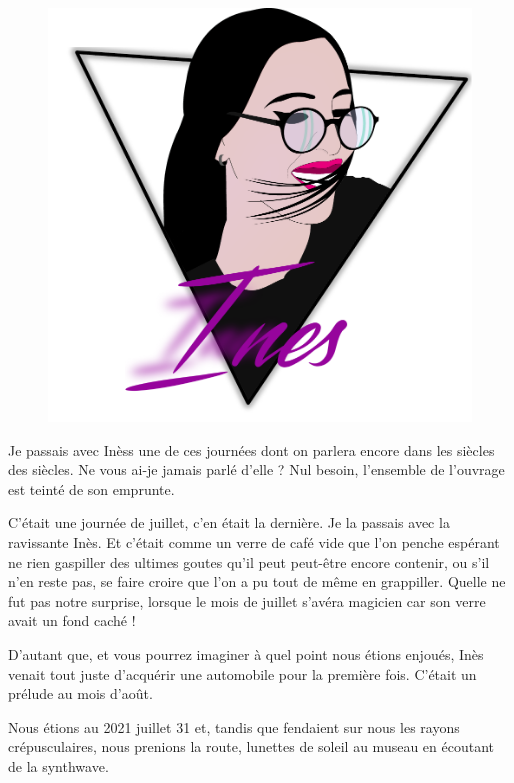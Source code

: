 \begin{figure}[h]
  \centering
  \includegraphics[width=\textwidth]{img/ines-syntwave.pdf}
  \captionsetup{labelformat=empty}
  \caption[Portrait synthwave d’Inèss]{}
\end{figure}

\begin{prose}
  Je passais avec Inèss une de ces journées dont on parlera encore dans les siècles des siècles. Ne vous ai-je jamais parlé d’elle ? Nul besoin, l’ensemble de l’ouvrage est teinté de son emprunte.

  C’était une journée de juillet, c’en était la dernière. Je la passais avec la ravissante Inès. Et c’était comme un verre de café vide que l’on penche espérant ne rien gaspiller des ultimes goutes qu’il peut peut-être encore contenir, ou s’il n’en reste pas, se faire croire que l’on a pu tout de même en grappiller.
  Quelle ne fut pas notre surprise, lorsque le mois de juillet s’avéra magicien car son verre avait un fond caché !

  D’autant que, et vous pourrez imaginer à quel point nous étions enjoués, Inès venait tout juste d’acquérir une automobile pour la première fois. C’était un prélude au mois d’août.

  Nous étions au 2021 juillet 31 et, tandis que fendaient sur nous les rayons crépusculaires, nous prenions la route, lunettes de soleil au museau en écoutant de la synthwave.
\end{prose}

